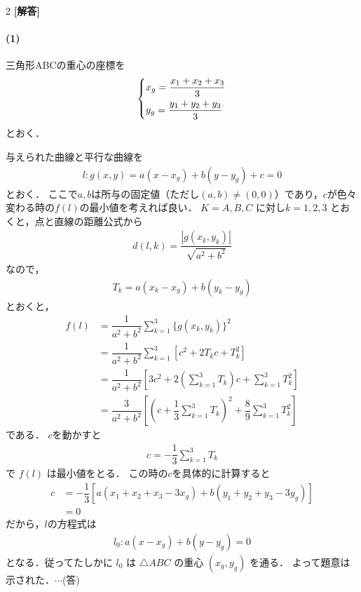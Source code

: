 \documentclass[../../main.tex]{subfiles}
\begin{document}
\setcounter{equation}{0}
\begin{oframed}
  
\end{oframed}
\setlength{\columnseprule}{0.4pt}
\begin{multicols}{2}
  {\bf [解答]}

  \paragraph{(1)}
  三角形ABCの重心の座標を
  \begin{align}
    \begin{dcases}
      x_g = \dfrac{x_1+x_2+x_3}{3} \\
      y_g = \dfrac{y_1+y_2+y_3}{3}
    \end{dcases}
  \end{align}
  とおく．

  与えられた曲線と平行な曲線を
  \begin{align}
    l: g(x,y) = a(x-x_g) + b(y-y_g) + c = 0
  \end{align}
  とおく．
  ここで$a,b$は所与の固定値（ただし$(a,b) \neq (0,0)$）であり，$c$が色々変わる時の$f(l)$の最小値を考えれば良い．
  $K=A,B,C$ に対し$k=1,2,3$ とおくと，点と直線の距離公式から
  \begin{align}
    d(l,k) = \dfrac{|g(x_k, y_k)|}{\sqrt{a^2+b^2}}
  \end{align}
  なので，
  \begin{align}
    T_k = a(x_k-x_g) + b(y_k-y_g)
  \end{align}
  とおくと，
  \begin{align}
    f(l)
    & = \dfrac{1}{a^2+b^2} \sum_{k=1}^{3} \{g(x_k, y_k)\}^2                                                              \\
    & = \dfrac{1}{a^2+b^2} \sum_{k=1}^{3} [c^2 + 2T_kc + T_k^2]                                                          \\
    & = \dfrac{1}{a^2+b^2} \left[3c^2 + 2(\sum_{k=1}^{3} T_k)c + \sum_{k=1}^{3} T_k^2\right]                             \\
    & = \dfrac{3}{a^2+b^2} \left[\left(c+\dfrac{1}{3}\sum_{k=1}^{3} T_k\right)^2 + \dfrac{8}{9}\sum_{k=1}^{3} T_k^2\right]
  \end{align}
  である．
  $c$を動かすと
  \begin{align}
    c = -\dfrac{1}{3}\sum_{k=1}^{3}T_k
  \end{align}
  で $f(l)$ は最小値をとる．
  この時の$c$を具体的に計算すると
  \begin{align}
    c
    & = -\dfrac{1}{3} [a(x_1+x_2+x_3 - 3x_g) + b(y_1+y_2+y_3 - 3y_g)] \\
    & = 0
  \end{align}
  だから，$l$の方程式は
  \begin{align}
    l_0 : a(x-x_g) + b(y-y_g) = 0
  \end{align}
  となる．従ってたしかに $l_0$ は $\triangle ABC$ の重心 $(x_g, y_g)$ を通る．
  よって題意は示された．$\cdots$(答)


\end{multicols}
\end{document}
